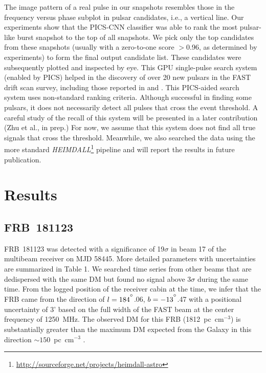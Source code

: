 The image pattern of a real pulse in our snapshots resembles those in the frequency versus phase subplot in pulsar candidates, i.e., a vertical line. Our experiments show that the PICS-CNN classifier was able to rank the most pulsar-like burst snapshot to the top of all snapshots. We pick only the top candidates from these snapshots (usually with a zero-to-one score $>$0.96, as determined by experiments) to form the final output candidate list. These candidates were subsequently plotted and inspected by eye. This GPU single-pulse search system (enabled by PICS) helped in the discovery of over 20 new pulsars in the FAST drift scan survey, including those reported in \citet{qpl+19} and \citet{zlh+19}. This PICS-aided search system uses non-standard ranking criteria. 
Although successful in finding some pulsars, it does not necessarily detect all pulses that cross the event threshold.
A careful study of the recall of this system will be presented in a later contribution (Zhu et al., in prep.) For now, we assume that this system does not find all true signals that cross the threshold. Meanwhile, we also searched the data using the more standard {\it HEIMDALL}\footnote{\url{http://sourceforge.net/projects/heimdall-astro}} \citep{bbbf12} pipeline and will report the results in future publication.

\section{Results}
\label{sec:result}

\subsection{FRB~181123}

FRB~181123 was detected with
a significance of 19$\sigma$ in beam 17 of the multibeam receiver on MJD 58445.
More detailed parameters with uncertainties are summarized in Table 1. 
We searched time series from other beams that are dedispersed with the same DM but found no signal above $3\sigma$ during the same time.
From the logged position of the receiver cabin at the time, we infer that the FRB came from the direction of $l=184^{\mbox{$^\circ$}}$.06, $b=-13^{\mbox{$^\circ$}}$.47 with a positional
uncertainty of 3' based on the full width of the FAST beam at the center frequency of 1250~MHz. The observed DM for this FRB (1812~pc~cm$^{-3}$) is substantially greater than the maximum DM expected from the Galaxy in this direction $\sim 150$~pc~cm$^{-3}$ \citep{ymw16}.



